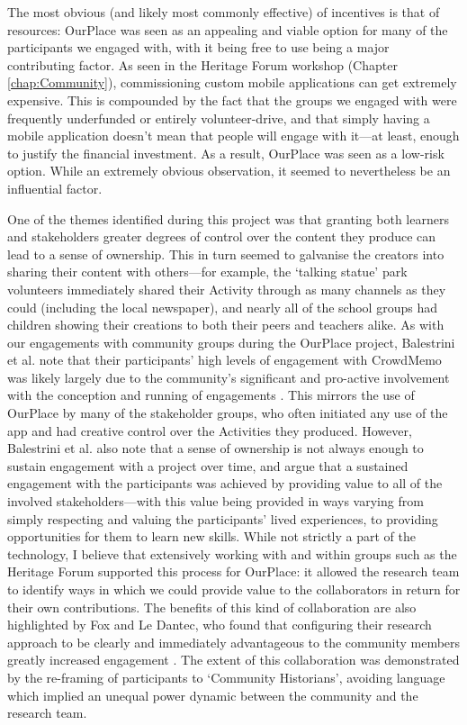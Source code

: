 The most obvious (and likely most commonly effective) of incentives is that of resources: OurPlace was seen as an appealing and viable option for many of the participants we engaged with, with it being free to use being a major contributing factor. As seen in the Heritage Forum workshop (Chapter \ref{chap:Community}), commissioning custom mobile applications can get extremely expensive. This is compounded by the fact that the groups we engaged with were frequently underfunded or entirely volunteer-drive, and that simply having a mobile application doesn't mean that people will engage with it---at least, enough to justify the financial investment. As a result, OurPlace was seen as a low-risk option. While an extremely obvious observation, it seemed to nevertheless be an influential factor.

One of the themes identified during this project was that granting both learners and stakeholders greater degrees of control over the content they produce can lead to a sense of ownership. This in turn seemed to galvanise the creators into sharing their content with others---for example, the `talking statue' park volunteers immediately shared their Activity through as many channels as they could (including the local newspaper), and nearly all of the school groups had children showing their creations to both their peers and teachers alike. As with our engagements with community groups during the OurPlace project, Balestrini et al. note that their participants' high levels of engagement with CrowdMemo was likely largely due to the community's significant and pro-active involvement with the conception and running of engagements \citep{Balestrini2014}. This mirrors the use of OurPlace by many of the stakeholder groups, who often initiated any use of the app and had creative control over the Activities they produced. However, Balestrini et al. also note that a sense of ownership is not always enough to sustain engagement with a project over time, and argue that a sustained engagement with the participants was achieved by providing value to all of the involved stakeholders---with this value being provided in ways varying from simply respecting and valuing the participants' lived experiences, to providing opportunities for them to learn new skills. While not strictly a part of the technology, I believe that extensively working with and within groups such as the Heritage Forum supported this process for OurPlace: it allowed the research team to identify ways in which we could provide value to the collaborators in return for their own contributions. The benefits of this kind of collaboration are also highlighted by Fox and Le Dantec, who found that configuring their research approach to be clearly and immediately advantageous to the community members greatly increased engagement \citep{Fox2014}. The extent of this collaboration was demonstrated by the re-framing of participants to `Community Historians', avoiding language which implied an unequal power dynamic between the community and the research team.

